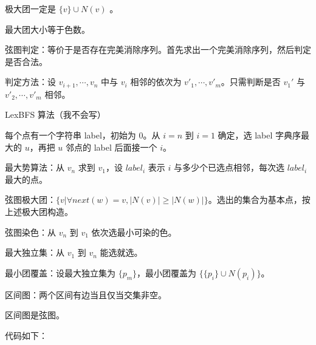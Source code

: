 \documentclass[12pt]{ctexart}
\begin{document}
极大团一定是 $\{v\}\cup N(v)$ 。

最大团大小等于色数。

弦图判定：等价于是否存在完美消除序列。首先求出一个完美消除序列，然后判定是否合法。

判定方法：设 $v_{i+1},\cdots,v_n$ 中与 $v_i$ 相邻的依次为 $v'_1,\cdots,v'_m$。只需判断是否 $v_1'$ 与 $v'_2,\cdots,v'_m$ 相邻。

LexBFS 算法（我不会写）

每个点有一个字符串 label，初始为 $0$。从 $i=n$ 到 $i=1$ 确定，选 label 字典序最大的 $u$，再把 $u$ 邻点的 label 后面接一个 $i$。

最大势算法：从 $v_n$ 求到 $v_1$，设 $label_i$ 表示 $i$ 与多少个已选点相邻，每次选 $label_i$ 最大的点。

弦图极大团：$\{v|\forall next(w)=v,|N(v)|\ge |N(w)|\}$。选出的集合为基本点，按上述极大团构造。

弦图染色：从 $v_n$ 到 $v_1$ 依次选最小可染的色。

最大独立集：从 $v_1$ 到 $v_n$ 能选就选。

最小团覆盖：设最大独立集为 $\{p_m\}$，最小团覆盖为 $\{\{p_i\}\cup N(p_i)\}$。

区间图：两个区间有边当且仅当交集非空。

区间图是弦图。

代码如下：
\end{document}
